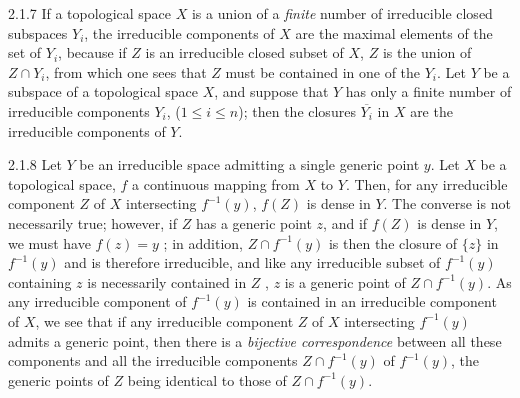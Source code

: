 \begin{env}{2.1.7}
If a topological space $X$ is a union of a \emph{finite} number of irreducible closed subspaces $Y_i$, the
irreducible components of $X$ are the maximal elements of the set of $Y_i$, because if $Z$ is an irreducible
closed subset of $X$, $Z$ is the union of $Z\cap Y_i$, from which one sees that $Z$ must be contained in one
of the $Y_i$. Let $Y$ be a subspace of a topological space $X$, and suppose that $Y$ has only a finite number
of irreducible components $Y_i$, ($1\leq i\leq n$); then the closures $\overline{Y_i}$ in $X$ are the
irreducible components of $Y$.
\end{env}

\begin{env}{2.1.8}
Let $Y$ be an irreducible space admitting a single generic point $y$.
Let $X$ be a topological space, $f$ a continuous mapping from $X$ to $Y$. Then, for
any irreducible component $Z$ of $X$ intersecting $f^{-1}(y)$, $f(Z)$ is dense in $Y$. The
converse is not necessarily true; however, if $Z$ has a generic point $z$,
and if $f(Z)$ is dense in $Y$, we must have $f(z)=y$ ; in addition, $Z\cap f^{-1}(y)$
is then the closure of $\{z\}$ in $f^{-1}(y)$ and is therefore irreducible, and like any
irreducible subset of $f^{-1}(y)$ containing $z$ is necessarily contained in $Z$ , $z$ is
a generic point of $Z\cap f^{-1}(y)$. As any irreducible component of $f^{-1}(y)$ is
contained in an irreducible component of $X$, we see that if any irreducible component
$Z$ of $X$ intersecting $f^{-1}(y)$ admits a generic point, then there is a \emph{bijective correspondence}
between all these components and all the irreducible components
$Z\cap f^{-1}(y)$ of $f^{-1}(y)$, the generic points of $Z$ being identical to those of $Z\cap f^{-1}(y)$.
\end{env}

